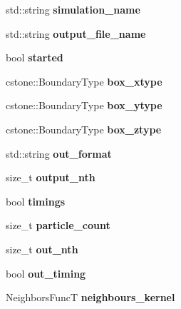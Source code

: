 \begin{DoxyCompactItemize}
std\+::string {\bfseries simulation\+\_\+name}
\item 
\mbox{\label{namespacewash_a4e3b615c7ac7e5c0cc44bfe52b7df557}} 
std\+::string {\bfseries output\+\_\+file\+\_\+name}
\item 
\mbox{\label{namespacewash_a37597bf1ffacb6fb6d4ac5db730fe436}} 
bool {\bfseries started}
\item 
\mbox{\label{namespacewash_a8c0da9131f4544d469602bc9f38aaa04}} 
cstone\+::\+Boundary\+Type {\bfseries box\+\_\+xtype}
\item 
\mbox{\label{namespacewash_a90050d690568d13ee3dfee971a349f00}} 
cstone\+::\+Boundary\+Type {\bfseries box\+\_\+ytype}
\item 
\mbox{\label{namespacewash_a9e584dee30db785be9fa1d5a1c5c8220}} 
cstone\+::\+Boundary\+Type {\bfseries box\+\_\+ztype}
\item 
\mbox{\label{namespacewash_a035f6f724e8c8720dfce129a9de67097}} 
std\+::string {\bfseries out\+\_\+format}
\item 
\mbox{\label{namespacewash_a7b6eb3e63a02fcbd9fafd59e34fbd320}} 
size\+\_\+t {\bfseries output\+\_\+nth}
\item 
\mbox{\label{namespacewash_a40aed5edcd0e0403841e3f83eaa41965}} 
bool {\bfseries timings}
\item 
\mbox{\label{namespacewash_a7845fa82d1b536c12c2d9495ede361ca}} 
size\+\_\+t {\bfseries particle\+\_\+count}
\item 
\mbox{\label{namespacewash_aa9f79200cc65dc6e48b4ef9af5d0c389}} 
size\+\_\+t {\bfseries out\+\_\+nth}
\item 
\mbox{\label{namespacewash_a6e885743f18d66ca373fb6c4c0146d1d}} 
bool {\bfseries out\+\_\+timing}
\item 
\mbox{\label{namespacewash_a0d969973e893cc2316bad2597bf0ad17}} 
Neighbors\+FuncT {\bfseries neighbours\+\_\+kernel}

\end{DoxyCompactItemize}
